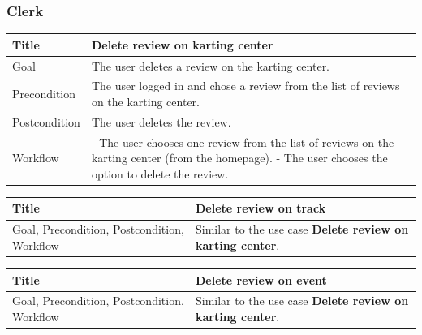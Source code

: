 \documentclass{beamer}
\begin{document}
\begin{frame}
    \frametitle{Clerk}
    \begin{table}
        \tiny
        \begin{tabular}{|p{2cm}|p{6cm}|}
        \hline  
        Title & \textbf{Delete review on karting center} \\
        \hline
        Goal & The user deletes a review on the karting center. \\
        \hline
        Precondition & The user logged in and chose a review from the list of reviews on the karting center. \\
        \hline
        Postcondition & The user deletes the review. \\
        \hline
        Workflow &
        - The user chooses one review from the list of reviews on the karting center (from the homepage). \newline
        - The user chooses the option to delete the review. \\
        \hline
        \end{tabular}
    \end{table}

    \begin{table}
        \tiny
        \begin{tabular}{|p{2cm}|p{6cm}|}
        \hline  
        Title & \textbf{Delete review on track} \\
        \hline
        Goal, Precondition, Postcondition, Workflow & Similar 
        to the use case \textbf{Delete review on karting center}. \\
        \hline
        \end{tabular}
    \end{table}

    \begin{table}
        \tiny
        \begin{tabular}{|p{2cm}|p{6cm}|}
        \hline  
        Title & \textbf{Delete review on event} \\
        \hline
        Goal, Precondition, Postcondition, Workflow & Similar 
        to the use case \textbf{Delete review on karting center}. \\
        \hline
        \end{tabular}
    \end{table}

\end{frame}

\end{document}
